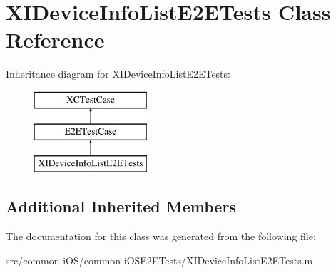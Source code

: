 \hypertarget{interface_x_i_device_info_list_e2_e_tests}{}\section{X\+I\+Device\+Info\+List\+E2\+E\+Tests Class Reference}
\label{interface_x_i_device_info_list_e2_e_tests}
Inheritance diagram for X\+I\+Device\+Info\+List\+E2\+E\+Tests\+:\begin{figure}[H]
\begin{center}
\leavevmode
\includegraphics[height=3.000000cm]{interface_x_i_device_info_list_e2_e_tests}
\end{center}
\end{figure}
\subsection*{Additional Inherited Members}


The documentation for this class was generated from the following file\+:\begin{DoxyCompactItemize}
\item 
src/common-\/i\+O\+S/common-\/i\+O\+S\+E2\+E\+Tests/X\+I\+Device\+Info\+List\+E2\+E\+Tests.\+m\end{DoxyCompactItemize}
